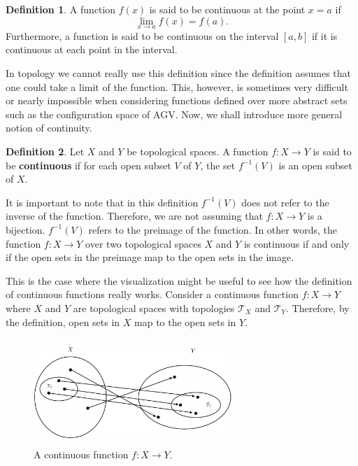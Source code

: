 \documentclass[a4paper, twocolumn]{article}
\newcommand{\topology}{\mathcal{T}}              %
\newcommand{\rarr}{\rightarrow}                  %
\theoremstyle{definition}
\newtheorem*{definition}{Definition}
\begin{document}
\begin{definition}
A function $f(x)$ is said to be continuous at the point $x = a$ if
$$\displaystyle\lim_{x \to a}f(x) = f(a).$$
Furthermore, a function is said to be continuous on the interval $[a, b]$ if it is continuous
at each point in the interval.
\end{definition}

In topology we cannot really use this definition since the definition assumes
that one could take a limit of the function. This, however, is sometimes very difficult or nearly impossible
when considering functions defined over more abstract sets such as the configuration space
of AGV. Now, we shall introduce more general notion of continuity.

\begin{definition}
\cite{5} Let $X$ and $Y$ be topological spaces. A function $f : X \to Y$ is said to be \textbf{continuous} if
for each open subset $V$ of $Y$, the set $f^{-1}(V)$ is an open subset of $X$.
\end{definition}

It is important to note that in this definition $f^{-1}(V)$ does not refer to the inverse of the function.
Therefore, we are not assuming that $f : X \rarr Y$ is a bijection. $f^{-1}(V)$ refers to the preimage of the function.
In other words, the function $f : X \to Y$ over two topological spaces $X$ and $Y$ is continuous if and only if the open
sets in the preimage map to the open sets in the image.

\medskip

This is the case where the visualization might be useful to see how the definition of continuous functions really works.
Consider a continuous function $f : X \to Y$ where $X$ and $Y$ are topological spaces with topologies $\topology_X$ and $\topology_Y$.
Therefore, by the definition, open sets in $X$ map to the open sets in $Y$.

\begin{figure}[H]
    \centering
    \includegraphics[width=7.5cm, height=4cm]{continuous-function}
    \caption*{A continuous function $f : X \to Y$.}
\end{figure}
\end{document}
